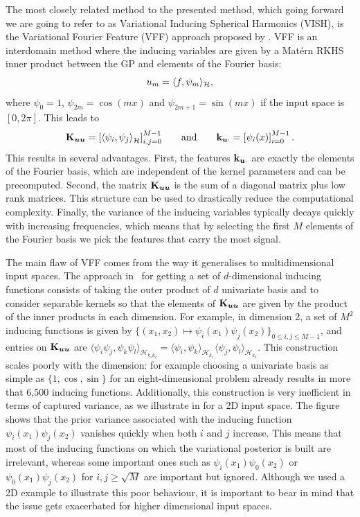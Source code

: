 The most closely related method to the presented method, which going forward we are going to refer to as Variational Inducing Spherical Harmonics (VISH), is the Variational Fourier Feature (VFF) approach proposed by \citet{hensman2017variational}. VFF is an interdomain method where the inducing variables are given by a Mat\'ern RKHS inner product between the GP and elements of the Fourier basis:
\begin{equation}
u_m = \langle f, \psi_m \rangle_{{\mathcal{H}}},
\end{equation}
where $\psi_0 = 1$, $\psi_{2m}=\cos(m x)$ and $\psi_{2m+1}=\sin(m x)$ if the input space is $[0, 2 \pi]$. This leads to
\begin{equation}
    \Kuu = \left[\langle \psi_i , \psi_{j} \rangle_\rkhs^{} \right]_{i, j = 0}^{M-1}\qquad\text{and}\qquad\kux = \left[ \psi_i(x)\right]_{i = 0}^{M-1}\, .
\end{equation}
This results in several advantages. First, the features $\mathbf{k}_{\bm{u} \cdot}$ are exactly the elements of the Fourier basis, which are independent of the kernel parameters and can be precomputed. Second, the matrix $\mathbf{{K}}_{\bm{u} \bm{u}}$ is the sum of a diagonal matrix plus low rank matrices. This structure can be used to drastically reduce the computational complexity. Finally, the variance of the inducing variables typically decays quickly with increasing frequencies, which means that by selecting the first $M$ elements of the Fourier basis we pick the features that carry the most signal.

The main flaw of VFF comes from the way it generalises to multidimensional input spaces. The approach in~\citet{hensman2017variational} for getting a set of $d$-dimensional inducing functions consists of taking the outer product of $d$ univariate basis and to consider separable kernels so that the elements of $\mathbf{{K}}_{\bm{u} \bm{u}}$ are given by the product of the inner products in each dimension. For example, in dimension 2, a set of $M^2$ inducing functions is given by $\{(x_1, x_2) \mapsto \psi_i(x_1)\psi_j(x_2)\}_{0 \leq i, j \leq M-1}$, and entries on $\mathbf{{K}}_{\bm{u} \bm{u}}$ are $\langle \psi_i\psi_j, \psi_k\psi_l \rangle_{\mathcal{H}_{k_1 k_2}^{}}^{} = \langle \psi_i, \psi_k \rangle_{\mathcal{H}_{k_1}^{}}^{} \langle \psi_j, \psi_l \rangle_{\mathcal{H}_{k_2}^{}}^{}$. This construction scales poorly with the dimension: for example choosing a univariate basis as simple as $\{1, \cos, \sin\}$ for an eight-dimensional problem already results in more that 6,500 inducing functions. Additionally, this construction is very inefficient in terms of captured variance, as we illustrate in   for a 2D input space. The figure shows that the prior variance associated with the inducing function $\psi_i(x_1)\psi_j(x_2)$ vanishes quickly when both $i$ and $j$ increase. This means that most of the inducing functions on which the variational posterior is built are irrelevant, whereas some important ones such as $\psi_i(x_1)\psi_0(x_2)$ or $\psi_0(x_1)\psi_j(x_2)$ for $i, j \geq \sqrt{M}$ are important but ignored. Although we used a 2D example to illustrate this poor behaviour, it is important to bear in mind that the issue gets exacerbated for higher dimensional input spaces.

